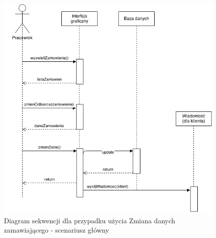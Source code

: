 \begin{figure}[H]
    \includegraphics[width=\textwidth,
    height=0.5\textheight]{graphics/UseCase/Zamowienia/ZmianaDanychZamawiajacegoSD.png}
    \caption{Diagram sekwencji dla przypadku użycia Zmiana danych zamawiającego
    - scenariusz główny}
\end{figure}
